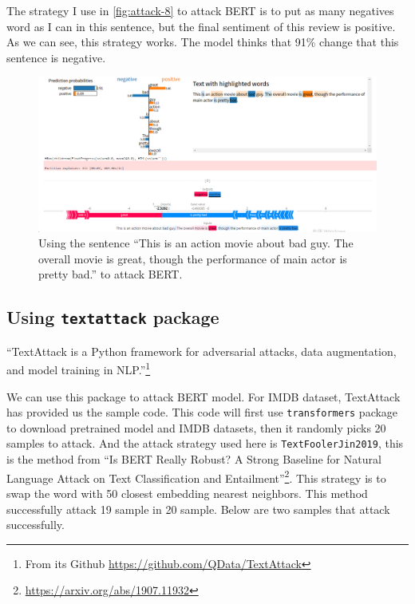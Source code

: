 \documentclass{article}[12pt]
\begin{document}
The strategy I use in \autoref{fig:attack-8} to attack BERT is to put as many negatives word as I can in this sentence, but the final sentiment of this review is positive. As we can see, this strategy works. The model thinks that 91\% change that this sentence is negative.

\begin{figure}[htbp]
	\centering
	\includegraphics[width=\linewidth]{figure/attack-8}
	\caption{Using the sentence ``This is an action movie about bad guy. The overall movie is great, though the performance of main actor is pretty bad.'' to attack BERT.}
	\label{fig:attack-8}
\end{figure}


\subsection{Using \texttt{textattack} package}

``TextAttack is a Python framework for adversarial attacks, data augmentation, and model training in NLP.''\footnote{From its Github \url{https://github.com/QData/TextAttack}}

We can use this package to attack BERT model. For IMDB dataset, TextAttack has provided us the sample code. This code will first use \texttt{transformers} package to download pretrained model and IMDB datasets, then it randomly picks 20 samples to attack. And the attack strategy used here is \texttt{TextFoolerJin2019}, this is the method from ``Is BERT Really Robust? A Strong Baseline for Natural Language Attack on Text Classification and Entailment''\footnote{\url{https://arxiv.org/abs/1907.11932}}. This strategy is to swap the word with 50 closest embedding nearest neighbors. This method successfully attack 19 sample in 20 sample. Below are two samples that attack successfully.
\end{document}
